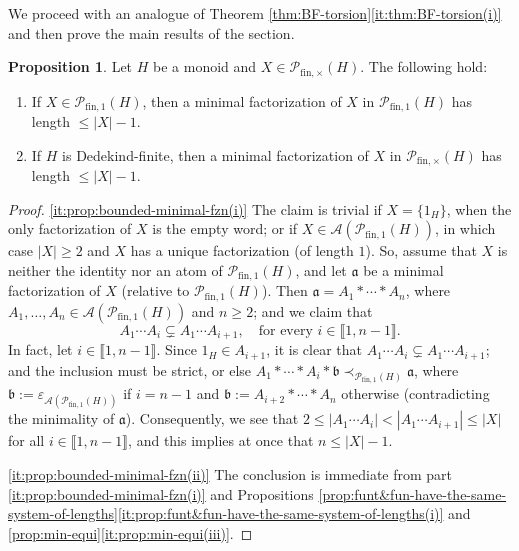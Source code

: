 \documentclass{report}
\renewcommand{\P}{\mathcal{P}}
\newcommand{\llb}{\llbracket}
\newcommand{\rrb}{\rrbracket}
\newcommand{\fin}{\textrm{fin}}
\newcommand{\funt}{{\textrm{fin}, \times}}
\newcommand{\fun}{{\textrm{fin}, 1}}
\renewcommand{\:}{\text{:}}
\theoremstyle{definition}
\newtheorem{prop}[defn]{Proposition}
\begin{document}
We proceed with an analogue of Theorem \ref{thm:BF-torsion}\ref{it:thm:BF-torsion(i)} and then prove the main results of the section.

\begin{prop}\label{prop:bounded-minimal-fzn}
	Let $H$ be a monoid and $X \in \P_\funt(H)$. The following hold:
	\begin{enumerate}[label={\rm (\roman{*})}]
		\item\label{it:prop:bounded-minimal-fzn(i)} If $X\in \P_\fun(H)$, then a minimal factorization of $X$ in $\P_\fun(H)$ has length $\le |X|-1$.
		\item\label{it:prop:bounded-minimal-fzn(ii)} If $H$ is Dedekind-finite, then a minimal factorization of $X$ in $\P_\funt(H)$ has length $\le |X|-1$.
	\end{enumerate}
\end{prop}
%
\begin{proof}
	\ref{it:prop:bounded-minimal-fzn(i)} The claim is trivial if $X = \{1_H\}$, when the only factorization of $X$ is the empty word; or if $X \in \mathscr A(\P_{\fin,1}(H))$, in which case $|X| \ge 2$ and $X$ has a unique factorization (of length $1$). So, assume that $X$ is neither the identity nor an atom of $\mathcal P_{\fin,1}(H)$, and let $\mathfrak a$ be a minimal factorization of $X$ (relative to $\P_{\fin,1}(H)$). Then $\mathfrak a = A_1*\cdots* A_n$, where $A_1, \ldots, A_n \in \mathscr A(\mathcal P_{\fin,1}(H))$ and $n \ge 2$; and we claim that
	\[
	A_1\cdots A_i \subsetneq A_1\cdots A_{i+1}, \quad \text{for every }i \in \llb 1, n-1 \rrb.
	\]
	In fact, let $i \in \llb 1, n-1 \rrb$. Since $1_H \in A_{i+1}$, it is clear that $A_1\cdots A_i \subsetneq A_1\cdots A_{i+1}$; and the inclusion must be strict, or else $A_1 \ast \cdots \ast A_i \ast \mathfrak b \prec_{\mathcal P_{\fin,1}(H)} \mathfrak a$, where $\mathfrak b := \varepsilon_{\mathscr A(\mathcal P_{\fin,1}(H))}$ if $i = n-1$ and $\mathfrak b := A_{i+2} \ast \cdots \ast A_n$ otherwise (contradicting the minimality of $\mathfrak a$). Consequently, we see that
	$
	2 \le |A_1\cdots A_i | < |A_1\cdots A_{i+1}| \le |X|$ for all $i \in \llb 1, n-1 \rrb$, and this implies at once that $n\le |X|-1$.
	
	\ref{it:prop:bounded-minimal-fzn(ii)} The conclusion is immediate from part \ref{it:prop:bounded-minimal-fzn(i)} and Propositions \ref{prop:funt&fun-have-the-same-system-of-lengths}\ref{it:prop:funt&fun-have-the-same-system-of-lengths(i)} and \ref{prop:min-equi}\ref{it:prop:min-equi(iii)}.
\end{proof}
\end{document}
